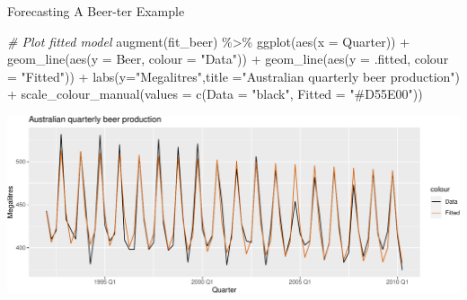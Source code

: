 \documentclass[
  ignorenonframetext,
]{beamer}
\newenvironment{Shaded}{\begin{snugshade}}{\end{snugshade}}
\newcommand{\AttributeTok}[1]{\textcolor[rgb]{0.77,0.63,0.00}{#1}}
\newcommand{\CommentTok}[1]{\textcolor[rgb]{0.56,0.35,0.01}{\textit{#1}}}
\newcommand{\FunctionTok}[1]{\textcolor[rgb]{0.00,0.00,0.00}{#1}}
\newcommand{\NormalTok}[1]{#1}
\newcommand{\SpecialCharTok}[1]{\textcolor[rgb]{0.00,0.00,0.00}{#1}}
\newcommand{\StringTok}[1]{\textcolor[rgb]{0.31,0.60,0.02}{#1}}
\begin{document}
\begin{frame}[fragile]{Forecasting \textbar{} \small A Beer-ter Example}
\protect\hypertarget{forecasting-a-beer-ter-example-3}{}
\tiny

\begin{Shaded}
\begin{Highlighting}[]
\CommentTok{\# Plot fitted model}
\FunctionTok{augment}\NormalTok{(fit\_beer) }\SpecialCharTok{\%\textgreater{}\%}
  \FunctionTok{ggplot}\NormalTok{(}\FunctionTok{aes}\NormalTok{(}\AttributeTok{x =}\NormalTok{ Quarter)) }\SpecialCharTok{+}
  \FunctionTok{geom\_line}\NormalTok{(}\FunctionTok{aes}\NormalTok{(}\AttributeTok{y =}\NormalTok{ Beer, }\AttributeTok{colour =} \StringTok{"Data"}\NormalTok{)) }\SpecialCharTok{+}
  \FunctionTok{geom\_line}\NormalTok{(}\FunctionTok{aes}\NormalTok{(}\AttributeTok{y =}\NormalTok{ .fitted, }\AttributeTok{colour =} \StringTok{"Fitted"}\NormalTok{)) }\SpecialCharTok{+}
  \FunctionTok{labs}\NormalTok{(}\AttributeTok{y=}\StringTok{"Megalitres"}\NormalTok{,}\AttributeTok{title =}\StringTok{"Australian quarterly beer production"}\NormalTok{) }\SpecialCharTok{+}
  \FunctionTok{scale\_colour\_manual}\NormalTok{(}\AttributeTok{values =} \FunctionTok{c}\NormalTok{(}\AttributeTok{Data =} \StringTok{"black"}\NormalTok{, }\AttributeTok{Fitted =} \StringTok{"\#D55E00"}\NormalTok{))}
\end{Highlighting}
\end{Shaded}

\includegraphics{Time-series-regression-models_files/figure-beamer/unnamed-chunk-45-1.pdf}

\normalfont
\end{frame}
\end{document}

